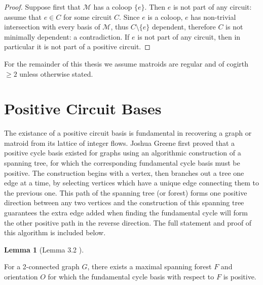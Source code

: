 \documentclass[12pt]{report}
\theoremstyle{definition}
\newtheorem{lemma}[theorem]{Lemma}
\def\calM{\mathcal M}
\theoremstyle{upright}
\begin{document}
\begin{proof}

    Suppose first that $\calM$ has a coloop $\{e\}$.
    Then $e$ is not part of any circuit: assume that $e\in C$ for some circuit $C$.
    Since $e$ is a coloop, $e$ has non-trivial intersection with every basis of $\calM$, thus $C\setminus\{e\}$ dependent, therefore $C$ is not minimally dependent: a contradiction.
    If $e$ is not part of any circuit, then in particular it is not part of a positive circuit.

\end{proof}

For the remainder of this thesis we assume matroids are regular and of cogirth $\geq2$ unless otherwise stated.

\section{Positive Circuit Bases}
\label{sec:PositiveBases}

The existance of a positive circuit basis is fundamental in recovering a graph or matroid from its lattice of integer flows.
Joshua Greene \cite{greene2013lattices} first proved that a positive cycle basis existed for graphs using an algorithmic construction of a spanning tree, for which the corresponding fundamental cycle basis must be positive.
The construction begins with a vertex, then branches out a tree one edge at a time, by selecting vertices which have a unique edge connecting them to the previous one.
This path of the spanning tree (or forest) forms one positive direction between any two vertices and the construction of this spanning tree guarantees the extra edge added when finding the fundamental cycle will form the other positive path in the reverse direction.
The full statement and proof of this algorithm is included below.

\begin{lemma}[Lemma 3.2 \cite{greene2013lattices}]\label{lem:PosCircuitBasisGraph}

    For a 2-connected graph $G$, there exists a maximal spanning forest $F$ and orientation $O$ for which the fundamental cycle basis with respect to $F$ is positive.

\end{lemma}
\end{document}

